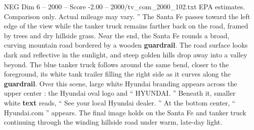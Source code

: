 \begin{textsample}{NEG Dim 6 – 2000 – Score -2.00 – 2000/tv\_com\_2000\_102.txt}
EPA estimates.
Comparison only.
Actual mileage may vary. ” The Santa Fe passes toward the left edge of the view while the tanker truck remains farther back on the road, framed by trees and dry hillside grass.
Near the end, the Santa Fe rounds a broad, curving mountain road bordered by a wooden \textbf{guardrail}.
The road surface looks dark and reflective in the sunlight, and steep golden hills drop away into a valley beyond.
The blue tanker truck follows around the same bend, closer to the foreground, its white tank trailer filling the right side as it curves along the \textbf{guardrail}.
Over this scene, large white Hyundai branding appears across the upper center : the Hyundai oval logo and “ HYUNDAI. ” Beneath it, smaller white \textbf{text} reads, “ See your local Hyundai dealer. ” At the bottom center, “ Hyundai.com ” appears.
The final image holds on the Santa Fe and tanker truck continuing through the winding hillside road under warm, late-day light.

\end{textsample}
